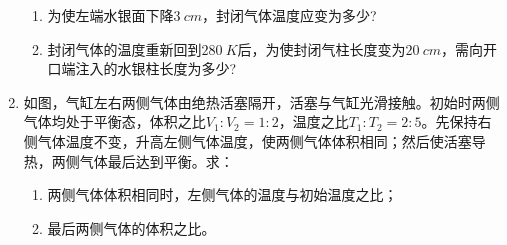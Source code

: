 \begin{enumerate}[leftmargin=0em]
\begin{enumerate}
\item 
为使左端水银面下降$ 3 \ cm $，封闭气体温度应变为多少?

\item 
封闭气体的温度重新回到$ 280\ K $后，为使封闭气柱长度变为$ 20 \ cm $，需向开口端注入的水银柱长度为多少?


\end{enumerate}

\begin{figure}[h!]
\flushright

\end{figure}



\item 
{}
如图，气缸左右两侧气体由绝热活塞隔开，活塞与气缸光滑接触。初始时两侧气体均处于平衡态，体积之比$ V_{1} : V_2=1 : 2 $，温度之比$ T_{1} : T_2=2 : 5 $。先保持右侧气体温度不变，升高左侧气体温度，使两侧气体体积相同；然后使活塞导热，两侧气体最后达到平衡。求：
\begin{enumerate}
\renewcommand{\labelenumi}{\arabic{enumi}.}
\item
两侧气体体积相同时，左侧气体的温度与初始温度之比；
\item 
最后两侧气体的体积之比。



\end{enumerate}

\begin{figure}[h!]
\flushright

\end{figure}



\end{enumerate}
